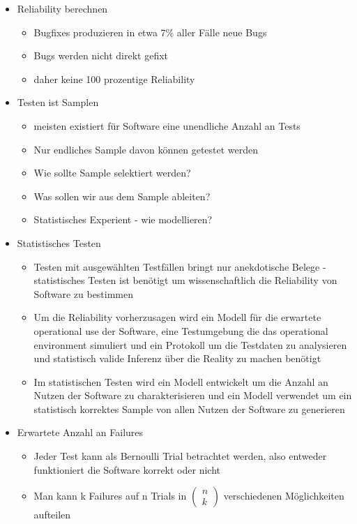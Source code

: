 \documentclass[paper=a4, fontsize=11pt]{scrartcl} %
\numberwithin{equation}{section} %
\numberwithin{figure}{section} %
\numberwithin{table}{section} %
\begin{document}
\begin{itemize}
  \item Reliability berechnen
  \begin{itemize}
    \item Bugfixes produzieren in etwa 7\% aller Fälle neue Bugs
    \item Bugs werden nicht direkt gefixt
    \item daher keine 100 prozentige Reliability
  \end{itemize}
  \item Testen ist Samplen
  \begin{itemize}
    \item meisten existiert für Software eine unendliche Anzahl an Tests
    \item Nur endliches Sample davon können getestet werden
    \item Wie sollte Sample selektiert werden?
    \item Was sollen wir aus dem Sample ableiten?
    \item Statistisches Experient - wie modellieren?
  \end{itemize}
  \item Statistisches Testen
  \begin{itemize}
    \item Testen mit ausgewählten Testfällen bringt nur anekdotische Belege - statistisches Testen ist benötigt um wissenschaftlich die Reliability von Software zu bestimmen
    \item Um die Reliability vorherzusagen wird ein Modell für die erwartete operational use der Software, eine Testumgebung die das operational environment simuliert und ein Protokoll um die Testdaten zu analysieren und statistisch valide Inferenz über die Reality zu machen benötigt
    \item Im statistischen Testen wird ein Modell entwickelt um die Anzahl an Nutzen der Software zu charakterisieren und ein Modell verwendet um ein statistisch korrektes Sample von allen Nutzen der Software zu generieren
  \end{itemize}
  \item Erwartete Anzahl an Failures
  \begin{itemize}
    \item Jeder Test kann als Bernoulli Trial betrachtet werden, also entweder funktioniert die Software korrekt oder nicht
    \item Man kann k Failures auf n Trials in $\begin{pmatrix}n \\k \end{pmatrix}$ verschiedenen Möglichkeiten aufteilen

\end{itemize}
\end{itemize}
\end{document}
